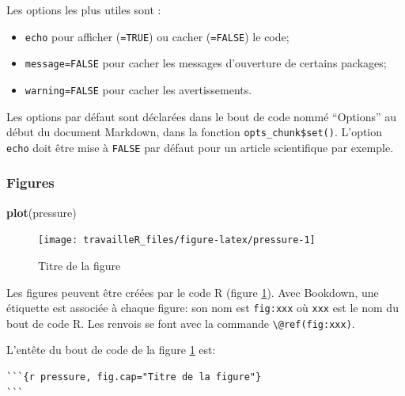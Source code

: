 \documentclass[
  12pt,
  french,
  a4paper,
  extrafontsizes,onecolumn,openright
  ]{memoir}
\newenvironment{Shaded}{\begin{snugshade}}{\end{snugshade}}
\newcommand{\KeywordTok}[1]{\textcolor[rgb]{0.13,0.29,0.53}{\textbf{#1}}}
\newcommand{\NormalTok}[1]{#1}
\providecommand{\tightlist}{%
  \setlength{\itemsep}{0pt}\setlength{\parskip}{0pt}}
\begin{document}
Les options les plus utiles sont :

\begin{itemize}
\tightlist
\item
  \texttt{echo} pour afficher (\texttt{=TRUE}) ou cacher (\texttt{=FALSE}) le code;
\item
  \texttt{message=FALSE} pour cacher les messages d'ouverture de certains packages;
\item
  \texttt{warning=FALSE} pour cacher les avertissements.
\end{itemize}

Les options par défaut sont déclarées dans le bout de code nommé \enquote{Options} au début du document Markdown, dans la fonction \texttt{opts\_chunk\$set()}.
L'option \texttt{echo} doit être mise à \texttt{FALSE} par défaut pour un article scientifique par exemple.

\hypertarget{figures}{%
\subsubsection{Figures}\label{figures}}

\scriptsize

\begin{Shaded}
\begin{Highlighting}[]
\KeywordTok{plot}\NormalTok{(pressure)}
\end{Highlighting}
\end{Shaded}

\begin{figure}

{\centering \texttt{[image: travailleR\_files/figure-latex/pressure-1]} 

}

\caption{Titre de la figure}\label{fig:pressure}
\end{figure}

\normalsize

Les figures peuvent être créées par le code R (figure \ref{fig:pressure}).
Avec Bookdown, une étiquette est associée à chaque figure: son nom est \texttt{fig:xxx} où \texttt{xxx} est le nom du bout de code R.
Les renvois se font avec la commande \texttt{\textbackslash{}@ref(fig:xxx)}.

L'entête du bout de code de la figure \ref{fig:pressure} est:

\begin{verbatim}
```{r pressure, fig.cap="Titre de la figure"}
```
\end{verbatim}
\end{document}
